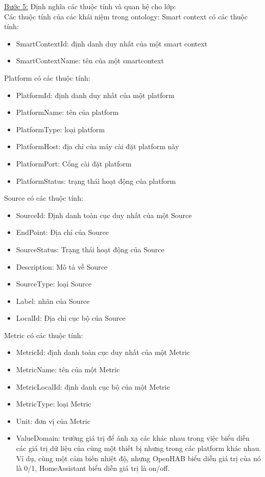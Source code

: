 \underline{Bước 5:} Định nghĩa các thuộc tính và quan hệ cho lớp:	\\
Các thuộc tính của các khái niệm trong ontology:
\hspace{0mm}Smart context có các thuộc tính:
\begin{itemize}
	\item SmartContextId: định danh duy nhất của một smart context
	\item SmartContextName: tên của một smartcontext
\end{itemize} 
\hspace{0mm}Platform có các thuộc tính:
\begin{itemize}
	\item PlatformId: định danh duy nhất của một platform
	\item PlatformName: tên của platform
	\item PlatformType: loại platform
	\item PlatformHost: địa chỉ của máy cài đặt platform này
	\item PlatformPort: Cổng cài đặt platform	
	\item PlatformStatus: trạng thái hoạt động của platform
\end{itemize}
\hspace{0mm}Source có các thuộc tính:
\begin{itemize}
	\item SourceId: Định danh toàn cục duy nhất của một Source
	\item EndPoint: Địa chỉ của Source
	\item SourceStatus: Trạng thái hoạt động của Source
	\item Description: Mô tả về Source
	\item SourceType: loại Source	
	\item Label: nhãn của Source
	\item LocalId: Địa chỉ cục bộ của Source
\end{itemize}
\hspace{0mm}Metric có các thuộc tính:
\begin{itemize}
	\item MetricId: định danh toàn cục duy nhất của một Metric
	\item MetricName: tên của một Metric
	\item MetricLocalId: định danh cục bộ của một Metric
	\item MetricType: loại Metric
	\item Unit: đơn vị của Metric
	\item ValueDomain: trường giá trị để ánh xạ các khác nhau trong việc biểu diễn các giá trị dữ liệu của cùng một thiết bị nhưng trong các platform khác nhau. Ví dụ, cùng một cảm biến nhiệt độ, nhưng OpenHAB biểu diễn giá trị của nó là 0/1, HomeAssistant biểu diễn giá trị là on/off.
\end{itemize}
